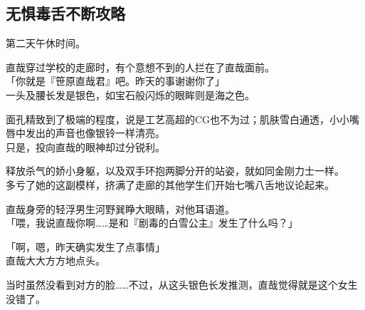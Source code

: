 \subsection{无惧毒舌不断攻略}

第二天午休时间。

直哉穿过学校的走廊时，有个意想不到的人拦在了直哉面前。\\

「你就是『笹原直哉君』吧。昨天的事谢谢你了」\\

一头及腰长发是银色，如宝石般闪烁的眼眸则是海之色。

面孔精致到了极端的程度，说是工艺高超的CG也不为过；肌肤雪白通透，小小嘴唇中发出的声音也像银铃一样清亮。\\

只是，投向直哉的眼神却过分锐利。

释放杀气的娇小身躯，以及双手环抱两脚分开的站姿，就如同金刚力士一样。\\

多亏了她的这副模样，挤满了走廊的其他学生们开始七嘴八舌地议论起来。

直哉身旁的轻浮男生河野巽睁大眼睛，对他耳语道。\\

「喂，我说直哉你啊……是和『剧毒的白雪公主』发生了什么吗？」

「啊，嗯，昨天确实发生了点事情」\\

直哉大大方方地点头。

当时虽然没看到对方的脸……不过，从这头银色长发推测，直哉觉得就是这个女生没错了。\\

